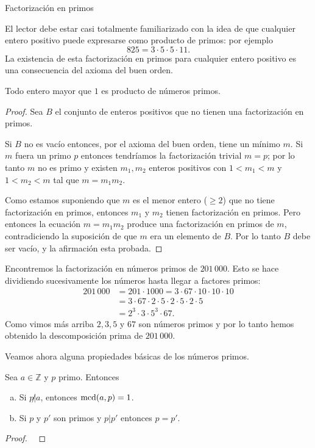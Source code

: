 \begin{section}{Factorización en primos}
\begin{observacion}
\end{observacion} 


El lector debe estar casi totalmente familiarizado con la idea de que cualquier entero positivo puede
expresarse como producto de primos: por ejemplo
$$
825=3\cdot 5\cdot 5\cdot 11.
$$
La existencia de esta factorización en primos para cualquier entero positivo es una consecuencia del axioma del buen orden.

\begin{teorema}
Todo  entero  mayor que $1$ es producto de números primos. 
\end{teorema}                                                
\begin{proof} Sea $B$ el conjunto de enteros positivos que no tienen una factorización en primos.

Si $B$ no es vacío entonces, por el axioma del buen orden, tiene un mínimo $m$. Si $m$ fuera un primo $p$ entonces tendríamos la factorización trivial $m=p$; por lo tanto $m$ no es primo y existen $m_1,m_2$ enteros positivos con  $1<m_1<m$ y $1<m_2< m$ tal que $m=m_1m_2$.

Como estamos suponiendo que $m$ es el menor entero ($\ge 2$) que no tiene factorización en primos, entonces $m_1$ y $m_2$ tienen factorización en primos. Pero entonces la ecuación $m=m_1m_2$ produce una factorización en primos de $m$, contradiciendo la suposición de que $m$ era un elemento de $B$. Por lo tanto $B$ debe ser vacío, y la afirmación esta probada.
\end{proof}

\begin{ejemplo} 
Encontremos la factorización en números primos de $201\,000$. Esto se hace di\-vi\-dien\-do  sucesivamente los números hasta llegar a factores primos:
\begin{align*}
201\,000 &= 201\cdot 1000 = 3\cdot 67\cdot 10\cdot 10\cdot 10\\ &=  3\cdot 67\cdot 2\cdot 5 \cdot 2\cdot 5 \cdot 2\cdot 5 \\&= 2^3\cdot 3\cdot 5^3\cdot 67.
\end{align*}
Como vimos más arriba $2, 3, 5$ y $67$ son  números primos y por lo tanto hemos obtenido la descomposición prima de $201\,000$.
\end{ejemplo}


Veamos ahora alguna propiedades básicas de los números primos.

\begin{observacion} \label{pdivpp}
Sea $a \in \mathbb Z$ y $p$ primo. Entonces 
\begin{enumerate}[a)]
\item  Si $p{\not|}a$, entonces $\operatorname{mcd}(a,p) = 1$.
\item  Si $p$ y $p'$ son primos y $p|p'$ entonces $p=p'$.
\end{enumerate}
\end{observacion}
\begin{proof}
\


\end{proof}
\end{section}

